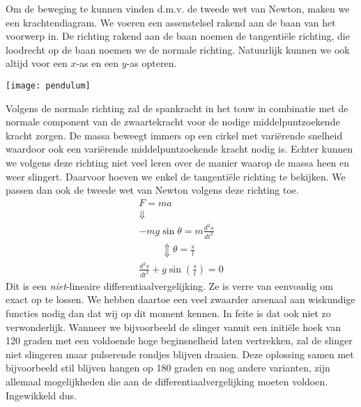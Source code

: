 \documentclass{ximera}
\begin{document}
	Om de beweging te kunnen vinden d.m.v. de tweede wet van Newton, maken we een krachtendiagram. We voeren een assenstelsel rakend aan de baan van het voorwerp in. De richting rakend aan de baan noemen de tangenti\"ele richting, die loodrecht op de baan noemen we de normale richting. Natuurlijk kunnen we ook altijd voor een $x$-as en een $y$-as opteren.
	\begin{image}
	\texttt{[image: pendulum]}
	\end{image}
	Volgens de normale richting zal de spankracht in het touw in combinatie met de normale component van de zwaartekracht voor de nodige middelpuntzoekende kracht zorgen. De massa beweegt immers op een cirkel met vari\"erende snelheid waardoor ook een vari\"erende middelpuntzoekende kracht nodig is. Echter kunnen we volgens deze richting niet veel leren over de manier waarop de massa heen en weer slingert. Daarvoor hoeven we enkel de tangenti\"ele richting te bekijken. We passen dan ook de tweede wet van Newton volgens deze richting toe. 
	\begin{gather*}
	F=ma\\
	\Downarrow\\
	-mg\sin\theta=m\frac{d^2s}{dt^2}\\
	\phantom{\theta=\frac{s}{l}}\Updownarrow\theta=\frac{s}{l}\\
	\frac{d^2s}{dt^2}+g\sin\left(\frac{s}{l}\right)=0
	\end{gather*}
	Dit is een \emph{niet}-lineaire differentiaalvergelijking. Ze is verre van eenvoudig om exact op te lossen. We hebben daartoe een veel zwaarder arsenaal aan wiskundige functies nodig dan dat wij op dit moment kennen. In feite is dat ook niet zo verwonderlijk. Wanneer we bijvoorbeeld de slinger vanuit een initi\"ele hoek van 120 graden met een voldoende hoge beginsnelheid laten vertrekken, zal de slinger niet slingeren maar pulserende rondjes blijven draaien. Deze oplossing samen met bijvoorbeeld stil blijven hangen op 180 graden en nog andere varianten, zijn allemaal mogelijkheden die aan de differentiaalvergelijking moeten voldoen. Ingewikkeld dus.
	
\end{document}
